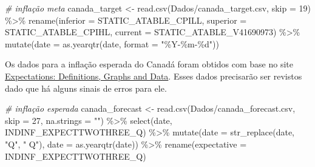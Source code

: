 \documentclass[
]{article}
\newenvironment{Shaded}{\begin{snugshade}}{\end{snugshade}}
\newcommand{\AttributeTok}[1]{\textcolor[rgb]{0.77,0.63,0.00}{#1}}
\newcommand{\CommentTok}[1]{\textcolor[rgb]{0.56,0.35,0.01}{\textit{#1}}}
\newcommand{\DecValTok}[1]{\textcolor[rgb]{0.00,0.00,0.81}{#1}}
\newcommand{\FunctionTok}[1]{\textcolor[rgb]{0.00,0.00,0.00}{#1}}
\newcommand{\NormalTok}[1]{#1}
\newcommand{\OtherTok}[1]{\textcolor[rgb]{0.56,0.35,0.01}{#1}}
\newcommand{\SpecialCharTok}[1]{\textcolor[rgb]{0.00,0.00,0.00}{#1}}
\newcommand{\StringTok}[1]{\textcolor[rgb]{0.31,0.60,0.02}{#1}}
\begin{document}
\begin{Shaded}
\begin{Highlighting}[]
\CommentTok{\# inflação meta}
\NormalTok{canada\_target }\OtherTok{\textless{}{-}} \FunctionTok{read.csv}\NormalTok{(}\StringTok{\textquotesingle{}Dados/canada\_target.csv\textquotesingle{}}\NormalTok{, }
                          \AttributeTok{skip =} \DecValTok{19}\NormalTok{) }\SpecialCharTok{\%\textgreater{}\%} 
  \FunctionTok{rename}\NormalTok{(}\AttributeTok{inferior =}\NormalTok{ STATIC\_ATABLE\_CPILL,}
         \AttributeTok{superior =}\NormalTok{ STATIC\_ATABLE\_CPIHL,}
         \AttributeTok{current =}\NormalTok{ STATIC\_ATABLE\_V41690973) }\SpecialCharTok{\%\textgreater{}\%} 
  \FunctionTok{mutate}\NormalTok{(}\AttributeTok{date =} \FunctionTok{as.yearqtr}\NormalTok{(date,}
                           \AttributeTok{format =} \StringTok{"\%Y{-}\%m{-}\%d"}\NormalTok{))}
\end{Highlighting}
\end{Shaded}

Os dados para a inflação esperada do Canadá foram obtidos com base no
site
\href{https://www.bankofcanada.ca/rates/indicators/capacity-and-inflation-pressures/expectations/}{Expectations:
Definitions, Graphs and Data}. Esses dados precisarão ser revistos dado
que há alguns sinais de erros para ele.

\begin{Shaded}
\begin{Highlighting}[]
\CommentTok{\# inflação esperada}
\NormalTok{canada\_forecast }\OtherTok{\textless{}{-}} \FunctionTok{read.csv}\NormalTok{(}\StringTok{\textquotesingle{}Dados/canada\_forecast.csv\textquotesingle{}}\NormalTok{, }
                            \AttributeTok{skip =} \DecValTok{27}\NormalTok{, }\AttributeTok{na.strings =} \StringTok{""}\NormalTok{) }\SpecialCharTok{\%\textgreater{}\%} 
  \FunctionTok{select}\NormalTok{(date, INDINF\_EXPECTTWOTHREE\_Q) }\SpecialCharTok{\%\textgreater{}\%} 
  \FunctionTok{mutate}\NormalTok{(}\AttributeTok{date =} \FunctionTok{str\_replace}\NormalTok{(date, }\StringTok{"Q"}\NormalTok{, }\StringTok{" Q"}\NormalTok{),}
         \AttributeTok{date =} \FunctionTok{as.yearqtr}\NormalTok{(date)) }\SpecialCharTok{\%\textgreater{}\%} 
  \FunctionTok{rename}\NormalTok{(}\AttributeTok{expectative =}\NormalTok{ INDINF\_EXPECTTWOTHREE\_Q)}
\end{Highlighting}
\end{Shaded}
\end{document}
